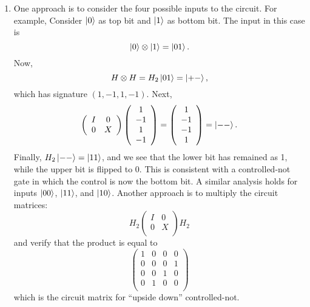 \documentclass [12pt]{article}
\theoremstyle{definition}
\begin{document}
\begin{enumerate}
\item 
One approach is to consider the four possible inputs to the circuit. For example, 
Consider $\ket{0}$ as top bit and $\ket{1}$ as bottom bit. The input in this case is 
\[\ket{0}\otimes \ket{1} = \ket{01}.\]
Now, 
\[H\otimes H = H_2\ket{01} = \ket{+-},\]
which has signature $(1,-1,1,-1)$. 
Next,
\[
\left(\begin{array}{cc}
I & 0\\
0 & X\\
\end{array}\right)
\left(\begin{array}{c}
1 \\
-1 \\
1\\
-1 \\
\end{array}\right)=
\left(\begin{array}{c}
1 \\
-1 \\
-1\\
1 \\
\end{array}\right)
=\ket{--}.
\]
Finally, $H_2\ket{--}=\ket{11}$, 
and we see that the lower bit has remained as 1, while the upper bit is flipped to 0.
This is consistent with a controlled-not gate in which the control is now the bottom bit.
A similar analysis holds for inputs $\ket{00}$, $\ket{11}$, and $\ket{10}$.
Another approach is to multiply the circuit matrices:
\[H_2 
\left(\begin{array}{cc}
I & 0\\
0 & X\\
\end{array}\right)
H_2\]
and verify that the product is equal to 
\[
\left(\begin{array}{cccc}
1 & 0 & 0 & 0 \\
0 & 0 & 0 & 1 \\
0 & 0 & 1 & 0 \\
0 & 1 & 0 & 0 \\
\end{array}\right)
\]
which is the circuit matrix for ``upside down'' controlled-not.



\end{enumerate}
\end{document}
